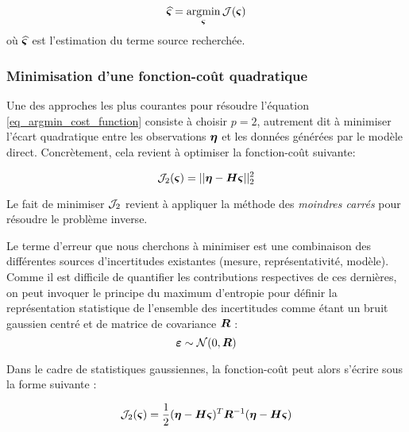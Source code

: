 \begin{equation}
\widehat{{\bm{\varsigma}}} = \operatorname*{\arg\!\min}_{\bm{\varsigma}} \mathcal{J}({\bm{\varsigma}})
\label{eq_argmin_cost_function}
\end{equation}
où $\widehat{{\bm{\varsigma}}}$ est l'estimation du terme source recherchée.

\subsubsection{Minimisation d'une fonction-coût quadratique}

Une des approches les plus courantes pour résoudre l'équation \eqref{eq_argmin_cost_function} consiste à choisir $p=2$, autrement dit à minimiser l'écart quadratique entre les observations ${\bm{\eta}}$ et les données générées par le modèle direct. Concrètement, cela revient à optimiser la fonction-coût suivante:

\begin{equation}
{\mathcal{J}}_{2}({\bm{\varsigma}}) = ||{\bm{\eta}} - {\bm{H}} {\bm{\varsigma}} ||_2^2
\label{eq_cost_MCO}
\end{equation}

Le fait de minimiser ${\mathcal{J}}_2$ revient à appliquer la méthode des \textit{moindres carrés} pour résoudre le problème inverse. 

Le terme d'erreur que nous cherchons à minimiser est une combinaison des différentes sources d'incertitudes existantes (mesure, représentativité, modèle). Comme il est difficile de quantifier les contributions respectives de ces dernières, on peut invoquer le principe du maximum d'entropie pour définir la représentation statistique de l'ensemble des incertitudes comme étant un bruit gaussien centré et de matrice de covariance ${\bm{R}}$ : 
\begin{equation}
{\bm{\varepsilon}} \sim \mathcal{N}(0,{\bm{R}})
\label{eq_bruit_obs}
\end{equation}

Dans le cadre de statistiques gaussiennes, la fonction-coût peut alors s'écrire sous la forme suivante \cite{Winiarek2011}:

\begin{equation}
\mathcal{J}_2({\bm{\varsigma}}) = \dfrac{1}{2}({\bm{\eta}} - {\bm{H}} {\bm{\varsigma}})^T {\bm{R}}^{-1}({\bm{\eta}} - {\bm{H}}{\bm{\varsigma}})
\label{eq_cost_forme2}
\end{equation}

	
